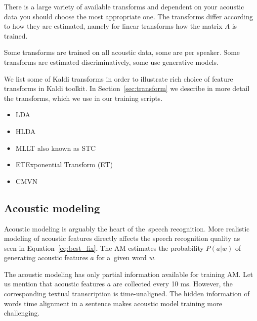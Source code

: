 {There is a large variety of available transforms and 
dependent on your acoustic data you should choose the most appropriate one.
The transforms differ according to how they are estimated,
namely for linear transforms how the matrix $A$ is trained.

Some transforms are trained on all acoustic data, some are per speaker.
Some transforms are estimated discriminatively, some use generative models.

We list some of Kaldi transforms in order to illustrate
rich choice of feature transforms in Kaldi toolkit.
In Section~\ref{sec:transform} we describe in more detail the transforms,
which we use in our training scripts.

\begin{itemize}
    \item \acl{LDA}\cite{gopinath1998maximum}
    \item \acl{HLDA}\cite{gales1999semi}
    \item \acl{MLLT} also known as \acl{STC}\cite{gopinath1998maximum}
    \item \acl{ET}Exponential Transform (ET)\cite{povey2011exponential}
    \item \acl{CMVN}\cite{molau2003feature}
\end{itemize}




\subsection{Acoustic modeling}
\label{sub:am}
Acoustic modeling is arguably the heart of the~speech recognition.
More realistic modeling of acoustic features directly affects the speech recognition quality 
as seen in Equation~\ref{eq:best_fix}. 
The \ac{AM} estimates the probability $P(a|w)$ of generating acoustic features $a$
for a~given word $w$.

The acoustic modeling has only partial information available for training \ac{AM}.
Let us mention that acoustic features $a$ are collected every 10 ms.
However, the corresponding textual transcription is time-unaligned.
The hidden information of words time alignment in a sentence
makes acoustic model training more challenging.

}
